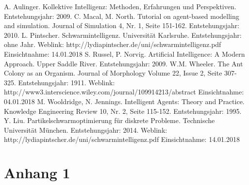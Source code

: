 \documentclass[a4paper, 11pt]{article}
\makeatletter
\newcommand*{\appendixtoc}{
	\begingroup
	\edef\@alltocdepth{\the\value{tocdepth}}
	\setcounter{tocdepth}{-10000}
	\renewcommand*{\contentsname}{
		Verzeichnis der Anh\"ange}
	\renewcommand*{\appendixattoc}{
		\setcounter{tocdepth}{\@alltocdepth}
	}
	\tableofcontents
	\setcounter{tocdepth}{\@alltocdepth}
	\endgroup
}
\newcommand*{\appendixattoc}{
}
\makeatother
\begin{document}
\newpage
\begin{thebibliography}{sotief}
	A. Aulinger. Kollektive Intelligenz: Methoden, Erfahrungen und Perspektiven. Entstehungsjahr: 2009.
	C. Macal, M. North. Tutorial on agent-based modelling and simulation. Journal of Simulation 4, Nr. 1, Seite 151-162. Entstehungsjahr: 2010.
	L. Pintscher. Schwarmintelligenz. Universität Karlsruhe. Entstehungsjahr: ohne Jahr.\newline\newline
	Weblink: http://lydiapintscher.de/uni/schwarmintelligenz.pdf \newline Einsichtnahme: 14.01.2018
	S. Russel, P. Norvig. Artificial Intelligence: A Modern Approach. Upper Saddle River. Entstehungsjahr: 2009.
	W.M. Wheeler. The Ant Colony as an Organism. Journal of Morphology Volume 22, Issue 2, Seite 307-325. Entstehungsjahr: 1911.\newline\newline
	Weblink: http://www3.interscience.wiley.com/journal/109914213/abstract \newline Einsichtnahme: 04.01.2018
	M. Wooldridge, N. Jennings. Intelligent Agents: Theory and Practice. Knowledge Engineering Review 10, Nr. 2, Seite 115-152. Entstehungsjahr: 1995.
	Y. Liu. Partikelschwarmoptimierung für diskrete Probleme. Technische Universität München. Entstehungsjahr: 2014.\newline\newline
	Weblink: http://lydiapintscher.de/uni/schwarmintelligenz.pdf \newline Einsichtnahme: 14.01.2018
	
\end{thebibliography}
\newpage
\appendixtoc
\newpage
\section{Anhang 1} 
\end{document}
